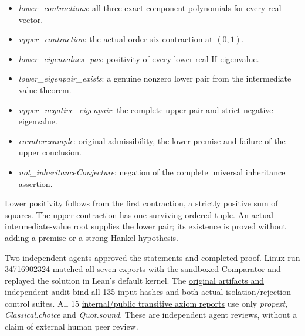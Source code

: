 \documentclass[11pt,a4paper]{article}
\providecommand{\tightlist}{\setlength{\itemsep}{0pt}\setlength{\parskip}{0pt}}
\begin{document}
\begin{itemize}
\tightlist
\item
  \textit{lower\_contractions}: all three exact component polynomials
  for every real vector.
\item
  \textit{upper\_contraction}: the actual order-six contraction at
  \((0,1)\).
\item
  \textit{lower\_eigenvalues\_pos}: positivity of every lower real
  H-eigenvalue.
\item
  \textit{lower\_eigenpair\_exists}: a genuine nonzero lower pair from
  the intermediate value theorem.
\item
  \textit{upper\_negative\_eigenpair}: the complete upper pair and
  strict negative eigenvalue.
\item
  \textit{counterexample}: original admissibility, the lower premise and
  failure of the upper conclusion.
\item
  \textit{not\_inheritanceConjecture}: negation of the complete
  universal inheritance assertion.
\end{itemize}

Lower positivity follows from the first contraction, a strictly positive
sum of squares. The upper contraction has one surviving ordered tuple.
An actual intermediate-value root supplies the lower pair; its existence
is proved without adding a premise or a strong-Hankel hypothesis.

Two independent agents approved the
\href{https://github.com/ajt60gaibb/OpenProblemsInNLA/blob/main/tensor-computations/TR-15/lean/reviews}{statements
and completed proof}.
\href{https://github.com/sgstepaniants/OpenProblemsInNLA/actions/runs/34716902324}{Linux
run 34716902324} matched all seven exports with the sandboxed Comparator
and replayed the solution in Lean's default kernel. The
\href{https://github.com/ajt60gaibb/OpenProblemsInNLA/blob/main/tensor-computations/TR-15/lean/verification/linux-2026-09-12}{original
artifacts and independent audit} bind all 135 input hashes and both
actual isolation/rejection-control suites. All 15
\href{https://github.com/ajt60gaibb/OpenProblemsInNLA/blob/main/tensor-computations/TR-15/lean/verification/linux-2026-09-12/axiom-verification.json}{internal/public
transitive axiom reports} use only \textit{propext},
\textit{Classical.choice} and \textit{Quot.sound}. These are independent
agent reviews, without a claim of external human peer review.
\end{document}
